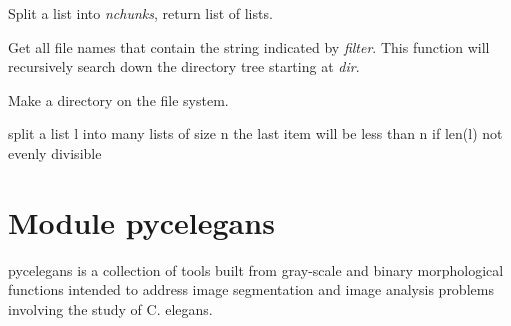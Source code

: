\documentclass[letterpaper,10pt,oneside]{sphinxmanual}
\begin{document}
\begin{fulllineitems}
\label{index:libutil.get_data_chunks}
Split a list into \emph{nchunks}, return list of lists.

\end{fulllineitems}


\begin{fulllineitems}
\label{index:libutil.get_file_names}
Get all file names that contain the string indicated by 
\emph{filter}.  This function will recursively search down the 
directory tree starting at \emph{dir}.

\end{fulllineitems}


\begin{fulllineitems}
\label{index:libutil.makedir}
Make a directory on the file system.

\end{fulllineitems}


\begin{fulllineitems}
\label{index:libutil.split_list}
split a list l into many lists of size n
the last item will be less than n if len(l) not evenly divisible

\end{fulllineitems}

\label{index:module-libcelegans}

\chapter{Module pycelegans}
\label{index:module-pycelegans}
pycelegans is a collection of tools built from gray-scale and binary
morphological functions intended to address image segmentation and 
image analysis problems involving the study of C. elegans.
\end{document}

